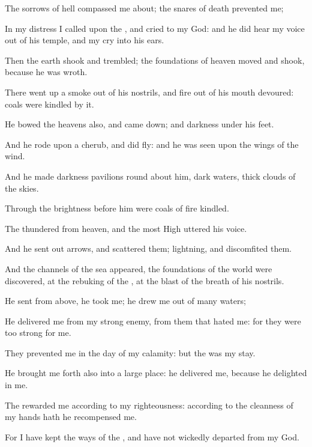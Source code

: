 {The
sorrows of
hell compassed me
about; the
snares of
death
prevented me;

In my
distress I
called upon the
{}, and
cried to my
God: and he did
hear my
voice out of his
temple, and my
cry
{} into his
ears.

Then the
earth
shook and
trembled; the
foundations of
heaven
moved and
shook, because he was
wroth.

There went
up a
smoke out of his
nostrils, and
fire out of his
mouth
devoured:
coals were
kindled by it.

He
bowed the
heavens also, and came
down; and
darkness
{} under his
feet.

And he
rode upon a
cherub, and did
fly: and he was
seen upon the
wings of the
wind.

And he
made
darkness
pavilions round
about him,
dark
waters,
{} thick
clouds of the
skies.

Through the
brightness before him were
coals of
fire
kindled.

The
{}
thundered from
heaven, and the most
High
uttered his
voice.

And he sent
out
arrows, and
scattered them;
lightning, and
discomfited them.

And the
channels of the
sea
appeared, the
foundations of the
world were
discovered, at the
rebuking of the
{}, at the
blast of the
breath of his
nostrils.

He
sent from
above, he
took me; he
drew me out of
many
waters;

He
delivered me from my
strong
enemy,
{} from them that
hated me: for they were too
strong for me.

They
prevented me in the
day of my
calamity: but the
{} was my
stay.

He brought me
forth also into a large
place: he
delivered me, because he
delighted in me.

The
{}
rewarded me according to my
righteousness: according to the
cleanness of my
hands hath he
recompensed me.

For I have
kept the
ways of the
{}, and have not wickedly
departed from my
God.

}
